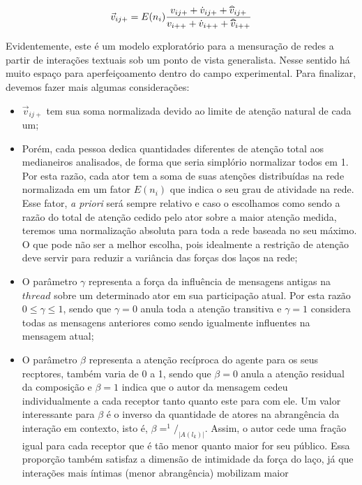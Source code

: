 \begin{equation}
\label{def:atetotal}
\vec{v}_{ij+} = E(n_i)\frac{v_{ij+} + \dot{v}_{ij+} +
\widetriangle{v}_{ij+}}{v_{i++} + \dot{v}_{i++} + \widetriangle{v}_{i++}}
\end{equation}

Evidentemente, este é um modelo exploratório para a mensuração de redes a partir
de interações textuais sob um ponto de vista generalista. Nesse sentido há muito
espaço para aperfeiçoamento dentro do campo experimental. Para finalizar,
devemos fazer mais algumas considerações:
\begin{itemize}
  \item $\vec{v}_{ij+}$ tem sua soma normalizada devido ao limite de atenção
  natural de cada um;
  \item Porém, cada pessoa dedica quantidades diferentes de atenção total aos
  medianeiros analisados, de forma que seria simplório normalizar todos em 1.
  Por esta razão, cada ator tem a soma de suas atenções distribuídas na rede
  normalizada em um fator $E(n_i)$ que indica o seu grau de atividade na rede.
  Esse fator, \emph{a priori} será sempre relativo e caso o escolhamos como
  sendo a razão do total de atenção cedido pelo ator sobre a maior atenção
  medida, teremos uma normalização absoluta para toda a rede baseada no seu
  máximo. O que pode não ser a melhor escolha, pois idealmente a restrição de
  atenção deve servir para reduzir a variância das forças dos laços na rede;
  \item O parâmetro $\gamma$ representa a força da influência de mensagens
  antigas na $thread$ sobre um determinado ator em sua participação atual. Por
  esta razão $0 \leq \gamma \leq 1$, sendo que $\gamma=0$ anula toda a atenção
  transitiva e $\gamma=1$ considera todas as mensagens anteriores como sendo
  igualmente influentes na mensagem atual;
  \item O parâmetro $\beta$ representa a atenção recíproca do agente para os
  seus recptores, também varia de 0 a 1, sendo que $\beta=0$ anula a atenção
  residual da composição e $\beta=1$ indica que o autor da mensagem cedeu
  individualmente a cada receptor tanto quanto este para com ele. Um valor
  interessante para $\beta$ é o inverso da quantidade de atores na abrangência
  da interação em contexto, isto é, $\beta=^1/_{|A(l_k)|}$. Assim, o autor cede
  uma fração igual para cada receptor que é tão menor quanto maior for seu
  público. Essa proporção também satisfaz a dimensão de intimidade da força do
  laço, já que interações mais íntimas (menor abrangência) mobilizam maior

\end{itemize}
